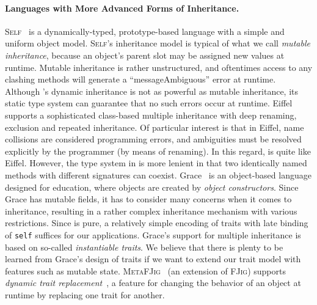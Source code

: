 \paragraph{Languages with More Advanced Forms of Inheritance.}
\textsc{Self}~\citep{ungar1988self} is a dynamically-typed, prototype-based
language with a simple and uniform object model. \textsc{Self}'s inheritance
model is typical of what we call \textit{mutable inheritance}, because an object's parent
slot may be assigned new values at runtime. Mutable inheritance is rather
unstructured, and oftentimes access to any clashing methods will generate a
``messageAmbiguous'' error at runtime. Although \name's dynamic inheritance is
not as powerful as mutable inheritance, its static type system can guarantee
that no such errors occur at runtime. Eiffel~\citep{meyer1987eiffel} supports a
sophisticated class-based multiple inheritance with deep renaming, exclusion
and repeated inheritance. Of particular interest is that in Eiffel, name
collisions are considered programming errors, and ambiguities must be resolved
explicitly by the programmer (by means of renaming). In this regard, \name is
quite like Eiffel. However, the type system in \name is more lenient in that two
identically named methods with different signatures can coexist. Grace~\citep{DBLP:journals/jot/NobleBBHJ17, DBLP:conf/ecoop/0002HNB16}
is an object-based language designed for education, where objects are created by
\textit{object constructors}.
Since Grace has mutable fields, it has to consider
many concerns when it comes to inheritance, resulting in a rather complex
inheritance mechanism with various restrictions.
Since \name is pure, a relatively simple
encoding of traits with late binding of \lstinline{self}
suffices for our applications. Grace's support for multiple inheritance is
based on so-called \emph{instantiable traits}.
We believe that there is plenty to be learned from
Grace's design of traits if we want to extend our trait model with
features such as mutable state. \textsc{MetaFJig}~\citep{SERVETTO2014219} (an extension of \textsc{FJig})
supports \textit{dynamic trait replacement}~\citep{chai_trait, BETTINI2013907, Ducasse_2006},
a feature for changing the behavior of an object at runtime by replacing one trait for another.




